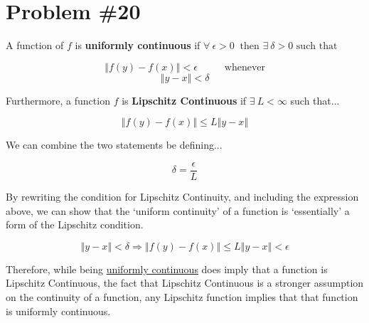 \section*{Problem \#20}
A function of $f$ is \textbf{uniformly continuous} if $\forall \: \epsilon > 0 \: \text{ then } \exists \: \delta > 0 \text{ such that }$

$$ \left\Vert f(y) - f(x) \right\Vert < \epsilon \hspace{1cm} \text{ whenever} $$
$$ \left\Vert y - x \right\Vert < \delta $$

\noindent Furthermore, a function $f$ is \textbf{Lipschitz Continuous} if $\exists \: L < \infty$ such that...

$$
\left\Vert f(y) - f(x) \right\Vert \leq L \left\Vert y -x \right\Vert
$$

\noindent We can combine the two statements be defining...

$$ \delta = \frac{\epsilon}{L} $$

\noindent By rewriting the condition for Lipschitz Continuity, and including the expression above, we can show that the `uniform continuity' of a function is `essentially' a form of the Lipschitz condition.

$$ \left\Vert y - x \right\Vert < \delta \Rightarrow \left\Vert f(y) - f(x) \right\Vert \leq L \left\Vert y - x \right\Vert < \epsilon   $$


\noindent Therefore, while being \underline{uniformly continuous} does  imply that a function is Lipschitz Continuous, the fact that Lipschitz Continuous is a stronger assumption on the continuity of a function, any Lipschitz function implies that that function is uniformly continuous. 
